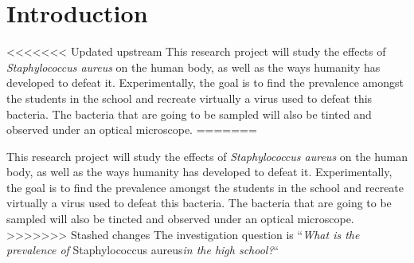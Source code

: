\section{Introduction}
<<<<<<< Updated upstream
This research project will study the effects of \emph{Staphylococcus aureus} on the human body, as well as the ways humanity has developed to defeat it. Experimentally, the goal is to find the prevalence amongst the students in the school and recreate virtually a virus used to defeat this bacteria. The bacteria that are going to be sampled will also be tinted and observed under an optical microscope.\newline
=======

This research project will study the effects of \emph{Staphylococcus aureus} on the human body, as well as the ways humanity has developed to defeat it. Experimentally, the goal is to find the prevalence amongst the students in the school and recreate virtually a virus used to defeat this bacteria. The bacteria that are going to be sampled will also be tincted and observed under an optical microscope.\newline
>>>>>>> Stashed changes
The investigation question is ``\emph{What is the prevalence of} Staphylococcus aureus\emph{in the high school?}``
